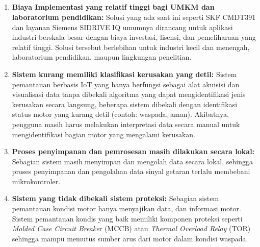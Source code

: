 \documentclass{elsinta}
\begin{document}
\subsection{\LimitationsTitle}
\begin{enumerate}
    \item \textbf{Biaya Implementasi yang relatif tinggi bagi UMKM dan laboratorium pendidikan:} Solusi yang ada saat ini seperti SKF CMDT391\cite{SKFGroup2021} dan layanan Siemens SIDRIVE IQ\cite{SiemensAG2023} umumnya dirancang untuk aplikasi industri berskala besar dengan biaya investasi, lisensi, dan pemeliharaan yang relatif tinggi. Solusi tersebut berlebihan untuk industri kecil dan menengah, laboratorium pendidikan, maupun lingkungan penelitian.
    \item \textbf{Sistem kurang memiliki klasifikasi kerusakan yang detil:} Sistem pemantauan berbasis IoT yang hanya berfungsi sebagai alat akuisisi dan visualisasi data tanpa dibekali algoritma yang dapat mengidentifikasi jenis kerusakan secara langsung\cite{Sonowal2019}, beberapa sistem dibekali dengan identifikasi status motor yang kurang detil (contoh: waspada, aman)\cite{Yusro2025, Silaban2026}. Akibatnya, pengguna masih harus melakukan interpretasi data secara manual untuk mengidentifikasi bagian motor yang mengalami kerusakan. 
    \item \textbf{Proses penyimpanan dan pemrosesan masih dilakukan secara lokal:} Sebagian sistem masih menyimpan dan mengolah data secara lokal\cite{Silaban2026, Sonowal2019, Yusro2025}, sehingga proses penyimpanan dan pengolahan data sinyal getaran terlalu membebani mikrokontroler.
    \item \textbf{Sistem yang tidak dibekali sistem proteksi:} Sebagian sistem pemantauan kondisi motor hanya menyajikan data, dan informasi motor\cite{Sonowal2019, Silaban2026, Yusro2025}. Sistem pemantauan kondis yang baik memiliki komponen proteksi seperti \textit{Molded Case Circuit Breake}r (MCCB) atau \textit{Thermal Overload Relay} (TOR) sehingga mampu memutus sumber arus dari motor dalam kondisi waspada.
\end{enumerate}
\end{document}
